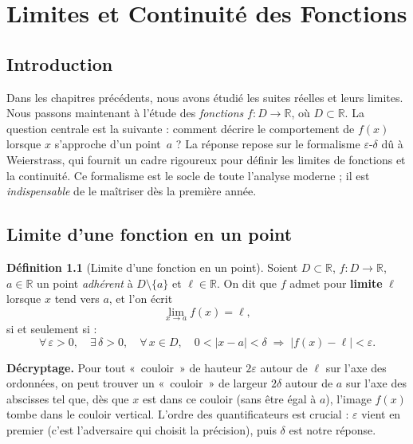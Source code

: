 \documentclass[12pt,a4paper,openany]{book}
\theoremstyle{definition}
\newtheorem{definition}{Définition}[chapter]
\newcommand{\R}{\mathbb{R}}
\begin{document}
\chapter{Limites et Continuité des Fonctions}\label{chap:limites-continuite}

\section*{Introduction}

Dans les chapitres précédents, nous avons étudié les suites réelles et leurs limites. Nous passons maintenant à l'étude des \emph{fonctions} $f \colon D \to \R$, où $D \subset \R$. La question centrale est la suivante : comment décrire le comportement de $f(x)$ lorsque $x$ s'approche d'un point~$a$ ? La réponse repose sur le formalisme $\varepsilon$-$\delta$ dû à Weierstrass, qui fournit un cadre rigoureux pour définir les limites de fonctions et la continuité. Ce formalisme est le socle de toute l'analyse moderne ; il est \emph{indispensable} de le maîtriser dès la première année.

\section{Limite d'une fonction en un point}\label{sec:limite-fonction}

\begin{definition}[Limite d'une fonction en un point]\label{def:limite-fonction}
Soient $D \subset \R$, $f \colon D \to \R$, $a \in \R$ un point \emph{adhérent} à $D \setminus \{a\}$ et $\ell \in \R$. On dit que $f$ admet pour \textbf{limite} $\ell$ lorsque $x$ tend vers $a$, et l'on écrit
\[
  \lim_{x \to a} f(x) = \ell,
\]
si et seulement si :
\[
  \forall\, \varepsilon > 0,\quad \exists\, \delta > 0,\quad
  \forall\, x \in D,\quad
  0 < |x - a| < \delta \;\Longrightarrow\; |f(x) - \ell| < \varepsilon.
\]

\medskip
\textbf{Décryptage.} Pour tout «~couloir~» de hauteur $2\varepsilon$ autour de $\ell$ sur l'axe des ordonnées, on peut trouver un «~couloir~» de largeur $2\delta$ autour de $a$ sur l'axe des abscisses tel que, dès que $x$ est dans ce couloir (sans être égal à $a$), l'image $f(x)$ tombe dans le couloir vertical. L'ordre des quantificateurs est crucial : $\varepsilon$ vient en premier (c'est l'adversaire qui choisit la précision), puis $\delta$ est notre réponse.
\end{definition}
\end{document}
